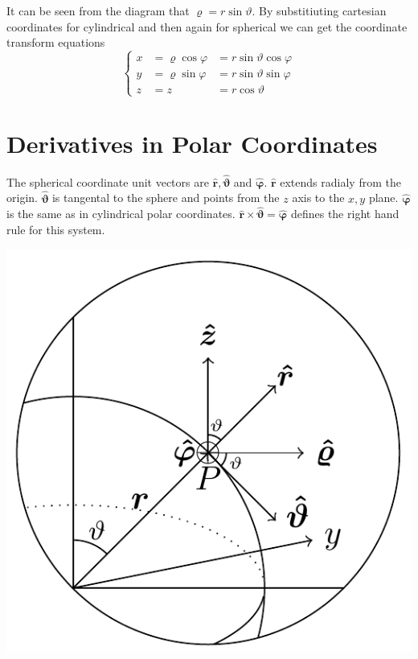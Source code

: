 \documentclass{article}
\newcommand{\vh}[1]{\vec{\hat{#1}}}
\renewcommand{\vec}[1]{\bm{#1}}
\begin{document}
It can be seen from the diagram that \(\varrho=r\sin\vartheta\). By substitiuting cartesian coordinates for cylindrical and then again for spherical we can get the coordinate transform equations
\[\left\{
\begin{array}{lll}
x & =\varrho\cos\varphi & =r\sin\vartheta\cos\varphi\\
y & =\varrho\sin\varphi & =r\sin\vartheta\sin\varphi\\
z & =z & =r\cos\vartheta
\end{array}
\right.\]

\section{Derivatives in Polar Coordinates}

The spherical coordinate unit vectors are \(\vh r,\vh\vartheta\) and \(\vh\varphi\). \(\vh r\) extends radialy from the origin. \(\vh\vartheta\) is tangental to the sphere and points from the \(z\) axis to the \(x,y\) plane. \(\vh\varphi\) is the same as in cylindrical polar coordinates. \(\vh r\times\vh\vartheta=\vh\varphi\) defines the right hand rule for this system.

\begin{center}
\includegraphics[scale=0.3]{SphericalPolarUnitVectors}
\end{center}
\end{document}
